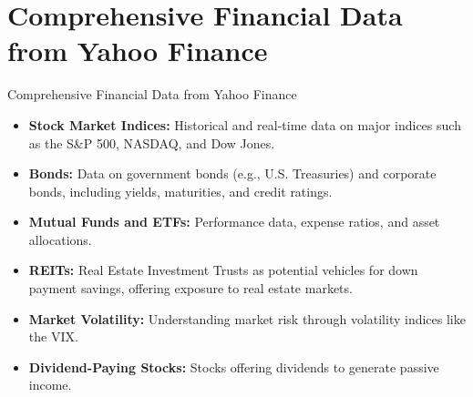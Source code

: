 \documentclass{beamer}
\begin{document}
\section{Comprehensive Financial Data from Yahoo Finance}
\begin{frame}{Comprehensive Financial Data from Yahoo Finance}
    \begin{itemize}
        \item \textbf{Stock Market Indices:} Historical and real-time data on major indices such as the S&P 500, NASDAQ, and Dow Jones.
        \item \textbf{Bonds:} Data on government bonds (e.g., U.S. Treasuries) and corporate bonds, including yields, maturities, and credit ratings.
        \item \textbf{Mutual Funds and ETFs:} Performance data, expense ratios, and asset allocations.
        \item \textbf{REITs:} Real Estate Investment Trusts as potential vehicles for down payment savings, offering exposure to real estate markets.
        \item \textbf{Market Volatility:} Understanding market risk through volatility indices like the VIX.
        \item \textbf{Dividend-Paying Stocks:} Stocks offering dividends to generate passive income.
    \end{itemize}
\end{frame}
\end{document}
